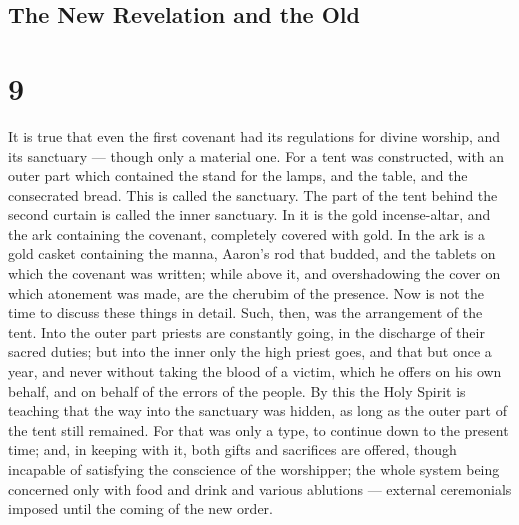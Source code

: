 \hypertarget{the-new-revelation-and-the-old}{%
\subsection{The New Revelation and the
Old}\label{the-new-revelation-and-the-old}}

\hypertarget{section-8}{%
\section{9}\label{section-8}}

 It is true that even the first covenant had its regulations
for divine worship, and its sanctuary --- though only a material one.
 For a tent was constructed, with an outer part which
contained the stand for the lamps, and the table, and the consecrated
bread. This is called the sanctuary.  The part of the tent
behind the second curtain is called the inner sanctuary.  In
it is the gold incense-altar, and the ark containing the covenant,
completely covered with gold. In the ark is a gold casket containing the
manna, Aaron's rod that budded, and the tablets on which the covenant
was written;  while above it, and overshadowing the cover on
which atonement was made, are the cherubim of the presence. Now is not
the time to discuss these things in detail.  Such, then, was
the arrangement of the tent. Into the outer part priests are constantly
going, in the discharge of their sacred duties;  but into
the inner only the high priest goes, and that but once a year, and never
without taking the blood of a victim, which he offers on his own behalf,
and on behalf of the errors of the people.  By this the Holy
Spirit is teaching that the way into the sanctuary was hidden, as long
as the outer part of the tent still remained.  For that was
only a type, to continue down to the present time; and, in keeping with
it, both gifts and sacrifices are offered, though incapable of
satisfying the conscience of the worshipper;  the whole
system being concerned only with food and drink and various ablutions
--- external ceremonials imposed until the coming of the new order.

